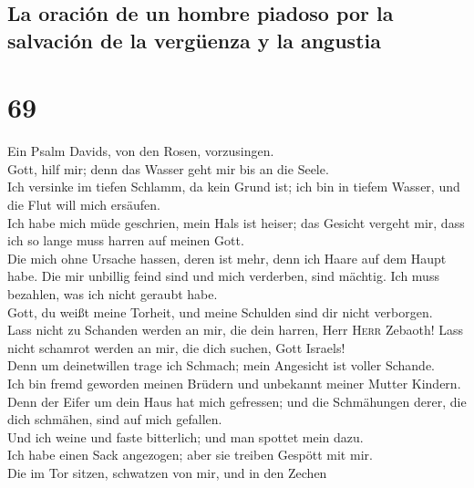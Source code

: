 \hypertarget{la-oraciuxf3n-de-un-hombre-piadoso-por-la-salvaciuxf3n-de-la-verguxfcenza-y-la-angustia}{%
\subsection{La oración de un hombre piadoso por la salvación de la
vergüenza y la
angustia}\label{la-oraciuxf3n-de-un-hombre-piadoso-por-la-salvaciuxf3n-de-la-verguxfcenza-y-la-angustia}}

\hypertarget{section-68}{%
\section{69}\label{section-68}}

 Ein Psalm Davids, von den Rosen, vorzusingen.\\
 Gott, hilf mir; denn das Wasser geht mir bis an die
Seele.\\
 Ich versinke im tiefen Schlamm, da kein Grund ist; ich
bin in tiefem Wasser, und die Flut will mich ersäufen.\\
 Ich habe mich müde geschrien, mein Hals ist heiser; das
Gesicht vergeht mir, dass ich so lange muss harren auf meinen Gott.\\
 Die mich ohne Ursache hassen, deren ist mehr, denn ich
Haare auf dem Haupt habe. Die mir unbillig feind sind und mich
verderben, sind mächtig. Ich muss bezahlen, was ich nicht geraubt
habe.\\
 Gott, du weißt meine Torheit, und meine Schulden sind dir
nicht verborgen.\\
 Lass nicht zu Schanden werden an mir, die dein harren,
Herr \textsc{Herr} Zebaoth! Lass nicht schamrot werden an mir, die dich
suchen, Gott Israels!\\
 Denn um deinetwillen trage ich Schmach; mein Angesicht
ist voller Schande.\\
 Ich bin fremd geworden meinen Brüdern und unbekannt
meiner Mutter Kindern.\\
 Denn der Eifer um dein Haus hat mich gefressen; und die
Schmähungen derer, die dich schmähen, sind auf mich gefallen.\\
 Und ich weine und faste bitterlich; und man spottet mein
dazu.\\
 Ich habe einen Sack angezogen; aber sie treiben Gespött
mit mir.\\
 Die im Tor sitzen, schwatzen von mir, und in den Zechen
